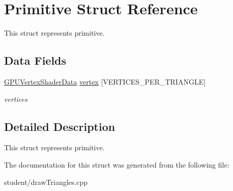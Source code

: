 \hypertarget{structPrimitive}{}\section{Primitive Struct Reference}
\label{structPrimitive}


This struct represents primitive.  


\subsection*{Data Fields}
\begin{DoxyCompactItemize}
\item 
\mbox{\label{structPrimitive_a2fcd6d4a9588c7e404fd0f83fecf5a47}} 
\hyperlink{structGPUVertexShaderData}{G\+P\+U\+Vertex\+Shader\+Data} \hyperlink{structPrimitive_a2fcd6d4a9588c7e404fd0f83fecf5a47}{vertex} \mbox{[}V\+E\+R\+T\+I\+C\+E\+S\+\_\+\+P\+E\+R\+\_\+\+T\+R\+I\+A\+N\+G\+LE\mbox{]}
\begin{DoxyCompactList}\small\item\em vertices \end{DoxyCompactList}\end{DoxyCompactItemize}


\subsection{Detailed Description}
This struct represents primitive. 

The documentation for this struct was generated from the following file\+:\begin{DoxyCompactItemize}
\item 
student/draw\+Triangles.\+cpp\end{DoxyCompactItemize}
